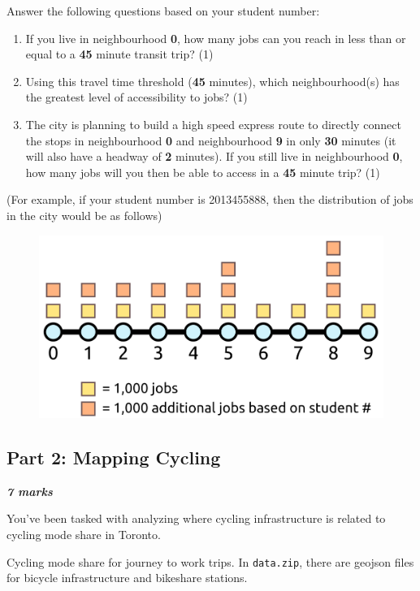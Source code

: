 \documentclass[11pt]{article}
\begin{document}
	Answer the following questions based on your student number:
	
	\begin{enumerate}
		
		
		\item If you live in neighbourhood \textbf{0}, how many jobs can you reach in less than or equal to a \textbf{45} minute transit trip? (1) 
		
		\item Using this travel time threshold (\textbf{45} minutes), which neighbourhood(s) has the greatest level of accessibility to jobs? (1) 
		
		\item The city is planning to build a high speed express route to directly connect the stops in neighbourhood \textbf{0} and neighbourhood \textbf{9} in only \textbf{30} minutes (it will also have a headway of \textbf{2} minutes). If you still live in neighbourhood \textbf{0}, how many jobs will you then be able to access in a \textbf{45} minute trip? (1) 
		
	\end{enumerate}

	(For example, if your student number is 2013455888, then the distribution of jobs in the city would be as follows)
	
	\begin{figure}[h]
		\centering
		\includegraphics[width=0.5\linewidth]{images/city_jobs.png}
	\end{figure}
	
	
	\subsection*{Part 2: Mapping Cycling}
	
	\vspace{-2mm}
	\textbf{\textit{7 marks}}
	
	You've been tasked with analyzing where cycling infrastructure is related to cycling mode share in Toronto. 
	
	Cycling mode share for journey to work trips. In \texttt{data.zip}, there are geojson files for bicycle infrastructure and bikeshare stations.
	
\end{document}

